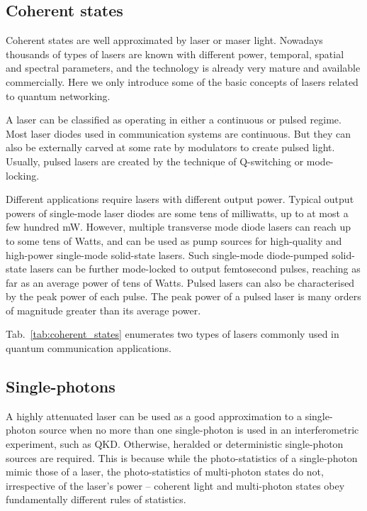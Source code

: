 \subsection{Coherent states} 

Coherent states are well approximated by laser or maser light. Nowadays thousands of types of lasers are known with different power, temporal, spatial and spectral parameters, and the technology is already very mature and available commercially. Here we only introduce some of the basic concepts of lasers related to quantum networking.

A laser can be classified as operating in either a continuous or pulsed regime. Most laser diodes used in communication systems are continuous. But they can also be externally carved at some rate by modulators to create pulsed light. Usually, pulsed lasers are created by the technique of Q-switching or mode-locking.

Different applications require lasers with different output power. Typical output powers of single-mode laser diodes are some tens of milliwatts, up to at most a few hundred mW. However, multiple transverse mode diode lasers can reach up to some tens of Watts, and can be used as pump sources for high-quality and high-power single-mode solid-state lasers. Such single-mode diode-pumped solid-state lasers can be further mode-locked to output femtosecond pulses, reaching as far as an average power of tens of Watts. Pulsed lasers can also be characterised by the peak power of each pulse. The peak power of a pulsed laser is many orders of magnitude greater than its average power.

Tab.~\ref{tab:coherent_states} enumerates two types of lasers commonly used in quantum communication applications.

%
%

\subsection{Single-photons} 

A highly attenuated laser can be used as a good approximation to a single-photon source when no more than one single-photon is used in an interferometric experiment, such as QKD. Otherwise, heralded or deterministic single-photon sources are required. This is because while the photo-statistics of a single-photon mimic those of a laser, the photo-statistics of multi-photon states do not, irrespective of the laser's power -- coherent light and multi-photon states obey fundamentally different rules of statistics.

